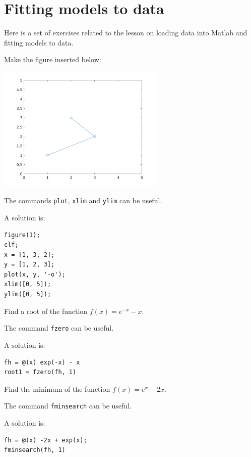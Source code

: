 \section{Fitting models to data}

Here is a set of exercises related to the lesson
on loading data into Matlab and fitting models to data.

\begin{ex}
Make the figure inserted below: \par
\noindent
\includegraphics[width=8cm]{pic/plotting/basic_plotting_010.png}
\begin{hint}
The commands \verb!plot!, \verb!xlim! and \verb!ylim! can be useful.
\end{hint}
\begin{sol}
A solution is:
\begin{verbatim}
figure(1);
clf;
x = [1, 3, 2];
y = [1, 2, 3];
plot(x, y, '-o');
xlim([0, 5]);
ylim([0, 5]);
\end{verbatim}
\end{sol}
\end{ex}

\begin{ex}
Find a root of the function $f(x) = e^{-x} - x$.
\begin{hint}
The command \verb!fzero! can be useful.
\end{hint}
\begin{sol}
A solution is:
\begin{verbatim}
fh = @(x) exp(-x) - x
root1 = fzero(fh, 1)
\end{verbatim}
\end{sol}
\end{ex}

\begin{ex}
Find the minimum of the function $f(x) = e^x - 2x$.
\begin{hint}
The command \verb!fminsearch! can be useful.
\end{hint}
\begin{sol}
A solution is:
\begin{verbatim}
fh = @(x) -2x + exp(x);
fminsearch(fh, 1)
\end{verbatim}
\end{sol}
\end{ex}




